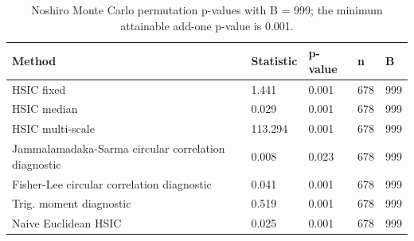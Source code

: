 \begin{table}[!htbp]
\centering
\scriptsize
\caption{Noshiro Monte Carlo permutation p-values with B = 999; the minimum attainable add-one p-value is 0.001.}
\label{tab:noshiro}
\begin{tabular}{lllll}
\toprule
Method & Statistic & p-value & n & B
\\
\midrule
HSIC fixed & 1.441 & 0.001 & 678 & 999\\
HSIC median & 0.029 & 0.001 & 678 & 999\\
HSIC multi-scale & 113.294 & 0.001 & 678 & 999\\
Jammalamadaka-Sarma circular correlation diagnostic & 0.008 & 0.023 & 678 & 999\\
Fisher-Lee circular correlation diagnostic & 0.041 & 0.001 & 678 & 999\\
Trig. moment diagnostic & 0.519 & 0.001 & 678 & 999\\
Naive Euclidean HSIC & 0.025 & 0.001 & 678 & 999\\
\bottomrule
\end{tabular}
\end{table}
